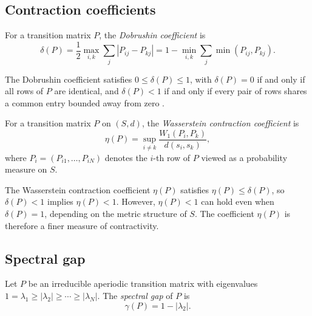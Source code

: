 \subsection{Contraction coefficients}

\begin{definition}\label{def:dobrushin}
For a transition matrix $P$, the \emph{Dobrushin coefficient} is
\begin{equation}\label{eq:dobrushin}
  \delta(P) = \frac{1}{2} \max_{i,k} \sum_j |P_{ij} - P_{kj}|
  = 1 - \min_{i,k} \sum_j \min(P_{ij}, P_{kj}).
\end{equation}
\end{definition}

The Dobrushin coefficient satisfies $0 \le \delta(P) \le 1$, with $\delta(P) = 0$
if and only if all rows of $P$ are identical, and $\delta(P) < 1$ if and only if
every pair of rows shares a common entry bounded away from zero
\cite{dobrushin1956central}.

\begin{definition}\label{def:eta}
For a transition matrix $P$ on $(S, d)$, the
\emph{Wasserstein contraction coefficient} is
\begin{equation}\label{eq:eta}
  \eta(P) = \sup_{i \ne k} \frac{W_1(P_i, P_k)}{d(s_i, s_k)},
\end{equation}
where $P_i = (P_{i1}, \ldots, P_{iN})$ denotes the $i$-th row of $P$ viewed
as a probability measure on $S$.
\end{definition}

\begin{remark}\label{rem:eta_delta}
The Wasserstein contraction coefficient $\eta(P)$ satisfies $\eta(P) \le \delta(P)$,
so $\delta(P) < 1$ implies $\eta(P) < 1$. However, $\eta(P) < 1$ can hold even
when $\delta(P) = 1$, depending on the metric structure of $S$. The coefficient
$\eta(P)$ is therefore a finer measure of contractivity.
\end{remark}

\subsection{Spectral gap}

\begin{definition}\label{def:gap}
Let $P$ be an irreducible aperiodic transition matrix with eigenvalues
$1 = \lambda_1 \ge |\lambda_2| \ge \cdots \ge |\lambda_N|$. The
\emph{spectral gap} of $P$ is
\begin{equation}\label{eq:gap}
  \gamma(P) = 1 - |\lambda_2|.
\end{equation}
\end{definition}

